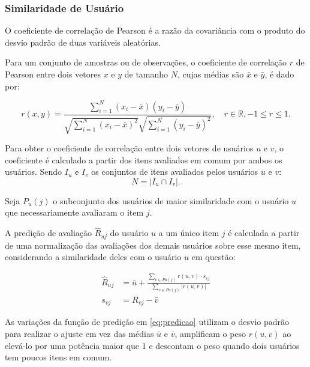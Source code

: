 \subsubsection{Similaridade de Usuário}
O coeficiente de correlação de Pearson é a razão da covariância com o produto
do desvio padrão de duas variáveis aleatórias.

Para um conjunto de amostras ou de observações, o coeficiente de
correlação $r$ de Pearson entre dois vetores $x$ e $y$ de tamanho $N$, cujas
médias são $\bar{x}$ e $\bar{y}$, é dado por:

\begin{equation}    
    r(x,y) = \frac{\sum_{i=1}^{N}(x_i - \bar{x})(y_i - \bar{y})}{\sqrt{\sum_{i=1}^{N}(x_i - \bar{x})^2} \sqrt{\sum_{i=1}^{N}(y_i - \bar{y})^2}}, \quad r \in \mathbb{R}, -1 \leq r \leq 1.
\end{equation}

Para obter o coeficiente de correlação entre dois vetores de usuários $u$ e $v$,
o coeficiente é calculado a partir dos itens avaliados em comum por ambos os
usuários. Sendo $I_u$ e $I_v$ os conjuntos de itens avaliados pelos usuários $u$ e $v$:
\begin{equation}
    N = |I_u \cap I_v|.
\end{equation}

Seja $P_u (j)$ o subconjunto dos usuários de maior similaridade com o usuário
$u$ que necessariamente avaliaram o item $j$.

A predição de avaliação
$\hat{R}_{uj}$ do usuário $u$ a um único item $j$ é calculada a partir de uma
normalização das avaliações dos demais usuários sobre esse mesmo item,
considerando a similaridade deles com o usuário $u$ em questão:

\begin{align}
    \label{eq:predicao}
\hat{R}_{uj} &= \bar{u} + \frac{\sum_{v \in Pu(j)} r(u,v) \cdot s_{vj}}{\sum_{v \in Pu(j)} |r(u,v)|} \\
s_{vj} &= R_{vj} - \bar{v} \label{eq:centered_mean}
\end{align}

As variações da função de predição em \ref{eq:predicao} utilizam o desvio padrão
para realizar o ajuste em vez das médias $\bar{u}$ e $\bar{v}$, amplificam o
peso $r(u,v)$ ao elevá-lo por uma potência maior que 1 e descontam o peso quando
dois usuários tem poucos itens em comum.

